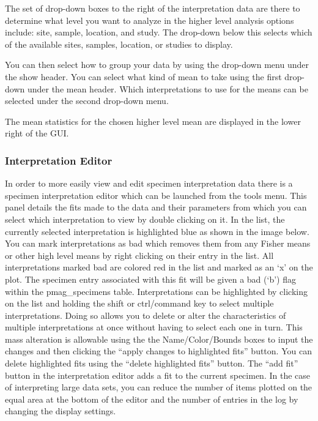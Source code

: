 \documentclass[11pt]{book}
\begin{document}
The set of drop-down boxes to the right of the interpretation data are there to determine what level you want to analyze in the higher level analysis options include: site, sample, location, and study. The drop-down below this selects which of the available sites, samples, location, or studies to display.

You can then select how to group your data by using the drop-down menu under the show header. You can select what kind of mean to take using the first drop-down under the mean header. Which interpretations to use for the means can be selected under the second drop-down menu.

The mean statistics for the chosen higher level mean are displayed in the lower right of the GUI.

\subsubsection{Interpretation Editor}\label{interpretation-editor}

In order to more easily view and edit specimen interpretation data there is a specimen interpretation editor which can be launched from the tools menu. This panel details the fits made to the data and their parameters from which you can select which interpretation to view by double clicking on it. In the list, the currently selected interpretation is highlighted blue as shown in the image below. You can mark interpretations as bad which removes them from any Fisher means or other high level means by right clicking on their entry in the list. All interpretations marked bad are colored red in the list and marked as an `x' on the plot. The specimen entry associated with this fit will be given a bad (`b') flag within the pmag\_specimens table. Interpretations can be highlighted by clicking on the list and holding the shift or ctrl/command key to select multiple interpretations. Doing so allows you to delete or alter the characteristics of multiple interpretations at once without having to select each one in turn. This mass alteration is allowable using the the Name/Color/Bounds boxes to input the changes and then clicking the ``apply changes to highlighted fits'' button. You can delete highlighted fits using the ``delete highlighted fits'' button. The ``add fit'' button in the interpretation editor adds a fit to the current specimen. In the case of interpreting large data sets, you can reduce the number of items plotted on the equal area at the bottom of the editor and the number of entries in the log by changing the display settings.
\end{document}
